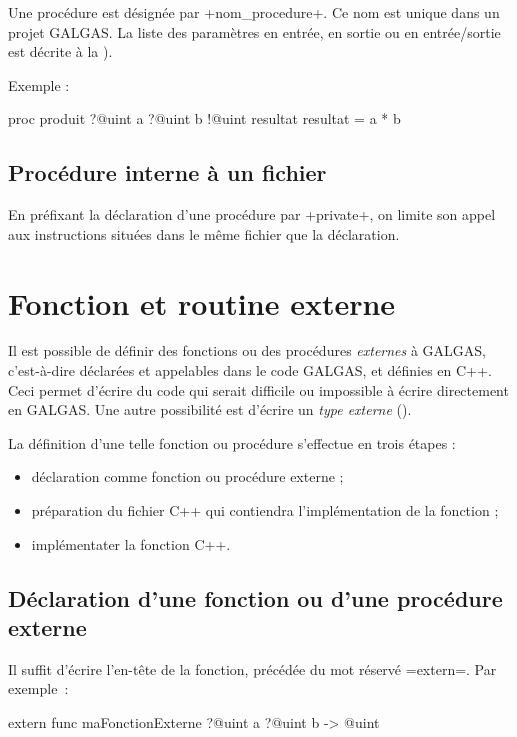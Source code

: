 Une procédure est désignée par \ggs+nom_procedure+. Ce nom est unique dans un projet GALGAS. La liste des paramètres en entrée, en sortie ou en entrée/sortie est décrite à la ).

Exemple :

\begin{galgas}
proc produit ?@uint a ?@uint b !@uint resultat {
  resultat = a * b
}
\end{galgas}



\subsection{Procédure interne à un fichier}

En préfixant la déclaration d'une procédure par \ggs+private+, on limite son appel aux instructions situées dans le même fichier que la déclaration.







\section{Fonction et routine externe}

Il est possible de définir des fonctions ou des procédures \emph{externes} à GALGAS, c'est-à-dire déclarées et appelables dans le code GALGAS, et définies en C++. Ceci permet d'écrire du code qui serait difficile ou impossible à écrire directement en GALGAS. Une autre possibilité est d'écrire un \emph{type externe} ().

La définition d'une telle fonction ou procédure s'effectue en trois étapes :
\begin{itemize}
  \item déclaration comme fonction ou procédure externe ;
  \item préparation du fichier C++ qui contiendra l'implémentation de la fonction ;
  \item implémentater la fonction C++.
\end{itemize}

\subsection{Déclaration d'une fonction ou d'une procédure externe}

Il suffit d'écrire l'en-tête de la fonction, précédée du mot réservé \ggs=extern=. Par exemple~:
\begin{galgas}
extern func maFonctionExterne ?@uint a ?@uint b -> @uint 
\end{galgas}

